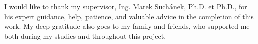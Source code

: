 \documentclass[english,bachelor,unicode,oneside]{ctufit-thesis}
\begin{document}
 
\frontmatter\frontmatterinit %

\thispagestyle{empty}\maketitle\thispagestyle{empty}\cleardoublepage %


\imprintpage %
\stopTOCentries

\begin{acknowledgmentpage}
	I would like to thank my supervisor, Ing. Marek Suchánek, Ph.D. et Ph.D., for his expert guidance, help, patience, and valuable advice in the completion of this work. My deep gratitude also goes to my family and friends, who supported me both during my studies and throughout this project.
\end{acknowledgmentpage} 
\end{document}
